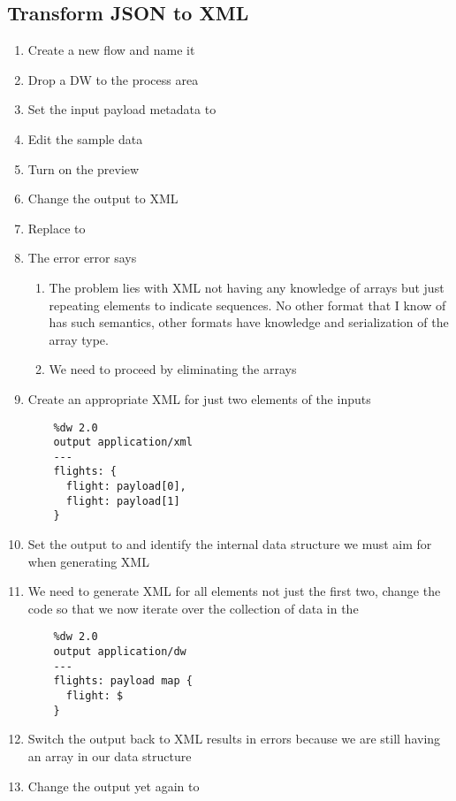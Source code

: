 \subsection{Transform JSON to XML}
\begin{enumerate}[resume*]

\item Create a new flow and name it 
\item Drop a DW to the process area
\item Set the input payload metadata to 
\item Edit the sample data
\item Turn on the preview
\item Change the output to XML
\item Replace \ttt{\{\}} to 
\item The error error says 
  \begin{enumerate}
  \item The problem lies with XML not having any knowledge of arrays but just repeating elements to indicate sequences.  No other format that I know of has such semantics, other formats have knowledge and serialization of the array type.
  \item We need to proceed by eliminating the arrays
  \end{enumerate}
\item Create an appropriate XML for just two elements of the inputs
  \lstset{language=dw}
  \begin{verbatim}
    %dw 2.0
    output application/xml
    ---
    flights: {
      flight: payload[0],
      flight: payload[1]
    }
  \end{verbatim}
\item Set the output to  and identify the internal data structure we must aim for when generating XML
\item We need to generate XML for all elements not just the first two, change the code so that we now iterate over the collection of data in the 
  \begin{verbatim}
    %dw 2.0
    output application/dw
    ---
    flights: payload map {
      flight: $
    }
  \end{verbatim}
\item Switch the output back to XML results in errors because we are still having an array in our data structure
\item Change the output yet again to 

\end{enumerate}
